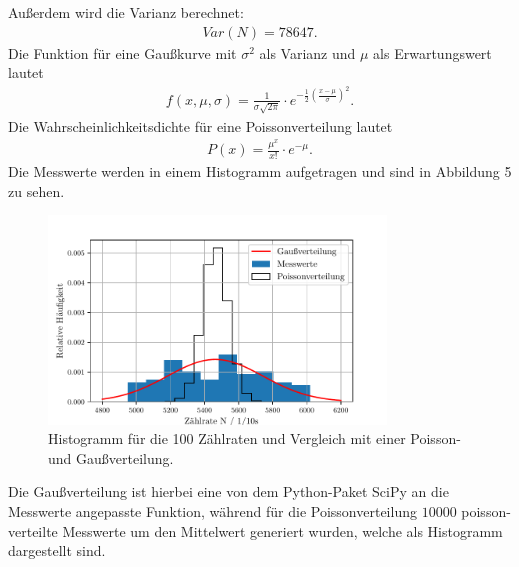 \noindent Außerdem wird die Varianz berechnet:
\begin{align*}
Var(N) = 78647 .
\end{align*}
Die Funktion für eine Gaußkurve mit $\sigma^2$ als Varianz und $\mu$ als Erwartungswert lautet
\begin{align*}
f(x,\mu,\sigma) = \frac{1}{\sigma \sqrt{2\pi}}\cdot e^{-\frac{1}{2}(\frac{x - \mu}{\sigma})^2}.
\end{align*}
Die Wahrscheinlichkeitsdichte für eine Poissonverteilung lautet
\begin{align*}
P(x) = \frac{\mu^x}{x!}\cdot e^{-\mu}.
\end{align*}
Die Messwerte werden in einem Histogramm aufgetragen und sind in Abbildung 5 zu sehen.
\begin{figure}[H]
  \centering
  \includegraphics[width=0.8\textwidth]{stats.pdf}
  \caption{Histogramm für die 100 Zählraten und Vergleich mit einer Poisson- und Gaußverteilung. }
  \label{fig:plot}
\end{figure}

Die Gaußverteilung ist hierbei eine von dem Python-Paket SciPy an die Messwerte angepasste Funktion,
während für die Poissonverteilung $10000$ poisson-verteilte Messwerte um den Mittelwert generiert wurden,
welche als Histogramm dargestellt sind.